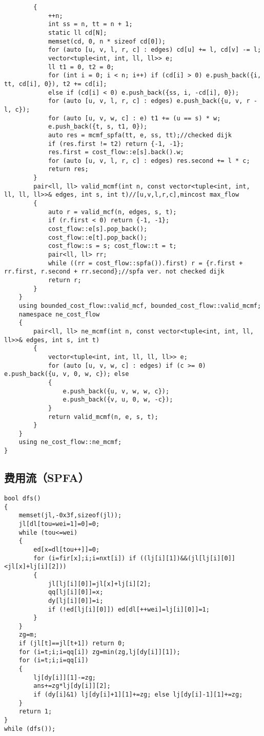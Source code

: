 \documentclass[12pt]{ctexart}
\begin{document}
\begin{lstlisting}
		{
			++n;
			int ss = n, tt = n + 1;
			static ll cd[N];
			memset(cd, 0, n * sizeof cd[0]);
			for (auto [u, v, l, r, c] : edges) cd[u] += l, cd[v] -= l;
			vector<tuple<int, int, ll, ll>> e;
			ll t1 = 0, t2 = 0;
			for (int i = 0; i < n; i++) if (cd[i] > 0) e.push_back({i, tt, cd[i], 0}), t2 += cd[i];
			else if (cd[i] < 0) e.push_back({ss, i, -cd[i], 0});
			for (auto [u, v, l, r, c] : edges) e.push_back({u, v, r - l, c});
			for (auto [u, v, w, c] : e) t1 += (u == s) * w;
			e.push_back({t, s, t1, 0});
			auto res = mcmf_spfa(tt, e, ss, tt);//checked dijk
			if (res.first != t2) return {-1, -1};
			res.first = cost_flow::e[s].back().w;
			for (auto [u, v, l, r, c] : edges) res.second += l * c;
			return res;
		}
		pair<ll, ll> valid_mcmf(int n, const vector<tuple<int, int, ll, ll, ll>>& edges, int s, int t)//[u,v,l,r,c],mincost max_flow
		{
			auto r = valid_mcf(n, edges, s, t);
			if (r.first < 0) return {-1, -1};
			cost_flow::e[s].pop_back();
			cost_flow::e[t].pop_back();
			cost_flow::s = s; cost_flow::t = t;
			pair<ll, ll> rr;
			while ((rr = cost_flow::spfa()).first) r = {r.first + rr.first, r.second + rr.second};//spfa ver. not checked dijk
			return r;
		}
	}
	using bounded_cost_flow::valid_mcf, bounded_cost_flow::valid_mcmf;
	namespace ne_cost_flow
	{
		pair<ll, ll> ne_mcmf(int n, const vector<tuple<int, int, ll, ll>>& edges, int s, int t)
		{
			vector<tuple<int, int, ll, ll, ll>> e;
			for (auto [u, v, w, c] : edges) if (c >= 0) e.push_back({u, v, 0, w, c}); else
			{
				e.push_back({u, v, w, w, c});
				e.push_back({v, u, 0, w, -c});
			}
			return valid_mcmf(n, e, s, t);
		}
	}
	using ne_cost_flow::ne_mcmf;
}
\end{lstlisting}

\subsection{费用流（SPFA）}

\begin{lstlisting}
bool dfs()
{
	memset(jl,-0x3f,sizeof(jl));
	jl[dl[tou=wei=1]=0]=0;
	while (tou<=wei)
	{
		ed[x=dl[tou++]]=0;
		for (i=fir[x];i;i=nxt[i]) if ((lj[i][1])&&(jl[lj[i][0]]<jl[x]+lj[i][2]))
		{
			jl[lj[i][0]]=jl[x]+lj[i][2];
			qq[lj[i][0]]=x;
			dy[lj[i][0]]=i;
			if (!ed[lj[i][0]]) ed[dl[++wei]=lj[i][0]]=1;
		}
	}
	zg=m;
	if (jl[t]==jl[t+1]) return 0;
	for (i=t;i;i=qq[i]) zg=min(zg,lj[dy[i]][1]);
	for (i=t;i;i=qq[i])
	{
		lj[dy[i]][1]-=zg;
		ans+=zg*lj[dy[i]][2];
		if (dy[i]&1) lj[dy[i]+1][1]+=zg; else lj[dy[i]-1][1]+=zg;
	}
	return 1;
}
while (dfs());
\end{lstlisting}
\end{document}
